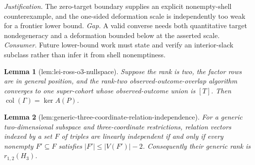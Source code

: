 \documentclass{article}
\newtheorem{lemma}{Lemma}
\begin{document}
\par\smallskip\noindent \textit{Justification.} The zero-target boundary supplies an explicit nonempty-shell counterexample, and the one-sided deformation scale is independently too weak for a frontier lower bound. \textit{Gap.} A valid converse needs both quantitative target nondegeneracy and a deformation bounded below at the asserted scale. \textit{Consumer.} Future lower-bound work must state and verify an interior-slack subclass rather than infer it from shell nonemptiness.

\begin{lemma}[lem:lei-ross-o3-nullspace]\label{lem:lei-ross-o3-nullspace}
Suppose the rank is two, the factor rows are in general position, and the rank-two observed-outcome-overlap algorithm converges to one super-cohort whose observed-outcome union is \([T]\). Then \(\operatorname{col}(\Gamma)=\ker A(P)\).
\end{lemma}

\begin{lemma}[lem:generic-three-coordinate-relation-independence]\label{lem:generic-three-coordinate-relation-independence}
For a generic two-dimensional subspace and three-coordinate restrictions, relation vectors indexed by a set \(F\) of triples are linearly independent if and only if every nonempty \(F'\subseteq F\) satisfies \(|F'|\leq |V(F')|-2\). Consequently their generic rank is \(r_{1,2}(H_3)\).
\end{lemma}
\end{document}

